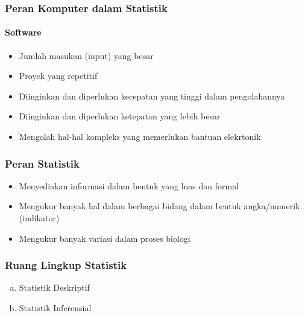 \documentclass[main.tex]{subfiles}
\begin{document}
\begin{frame}[c]
	\frametitle{Peran Komputer dalam Statistik}
	\framesubtitle{Software}
	\begin{itemize}
		\item Jumlah masukan (input) yang besar
		\item Proyek yang repetitif
		\item Diinginkan dan diperlukan kecepatan yang tinggi dalam pengolahannya
		\item Diinginkan dan diperlukan ketepatan yang lebih besar
		\item Mengolah hal-hal kompleks yang memerlukan bantuan elekrtonik
	\end{itemize}
\end{frame}

\begin{frame}[c]
	\frametitle{Peran Statistik}
	\begin{itemize}
		\item Menyediakan informasi dalam bentuk      yang luas dan formal
		\item Mengukur banyak hal dalam berbagai bidang dalam bentuk angka/numerik (indikator)
		\item Mengukur banyak variasi dalam proses biologi
	\end{itemize}
\end{frame}

\begin{frame}[c]
	\frametitle{Ruang Lingkup Statistik}
	\begin{enumerate}[(a)]
		\color{blue}
		\item Statistik Deskriptif
		\item Statistik Inferensial
	\end{enumerate}
\end{frame}










\end{document}
